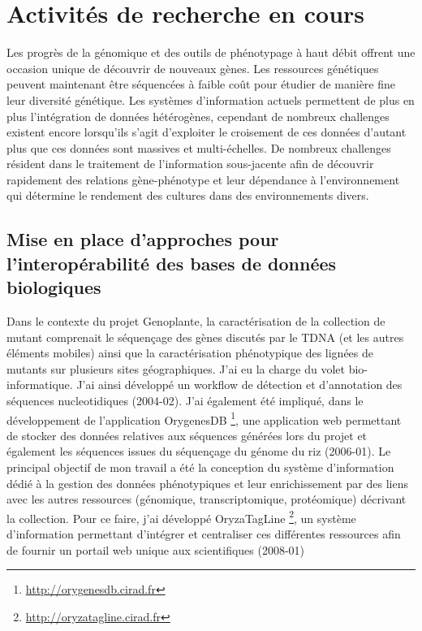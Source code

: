 \section{Activités de recherche en cours}

Les progrès de la génomique et des outils de phénotypage à haut débit offrent une occasion unique de découvrir de nouveaux gènes. Les ressources génétiques peuvent maintenant être séquencées à faible coût pour étudier de manière fine leur diversité génétique. Les systèmes d'information actuels permettent de plus en plus l'intégration de données hétérogènes, cependant de nombreux challenges existent encore lorsqu'ils s'agit d'exploiter le croisement de ces données d'autant plus que ces données sont massives et multi-échelles. De nombreux challenges résident dans le traitement de l'information sous-jacente afin de découvrir rapidement des relations gène-phénotype et leur dépendance à l’environnement qui détermine le rendement des cultures dans des environnements divers.

\subsection*{Mise en place d’approches pour l’interopérabilité des bases de données biologiques}

Dans le contexte du projet Genoplante, la caractérisation de la collection de mutant comprenait le séquençage des gènes discutés par le TDNA (et les autres éléments mobiles) ainsi que la caractérisation phénotypique des lignées de mutants sur plusieurs sites géographiques. J'ai eu la charge du volet bio-informatique. J'ai ainsi développé un workflow de détection et d'annotation des séquences nucleotidiques (2004-02). J'ai également été impliqué, dans le développement de l'application OrygenesDB \footnote{\url{http://orygenesdb.cirad.fr}}, une application web permettant de stocker des données relatives aux séquences générées lors du projet et également les séquences issues du séquençage du génome du riz (2006-01). Le principal objectif de mon travail a été la conception du système d'information dédié à la gestion des données phénotypiques et leur enrichissement par des liens avec les autres ressources (génomique, transcriptomique, protéomique) décrivant la collection. Pour ce faire, j’ai développé OryzaTagLine \footnote{\url{http://oryzatagline.cirad.fr}}, un système d’information permettant d’intégrer et centraliser ces différentes ressources afin de fournir un portail web unique aux scientifiques (2008-01)\\


